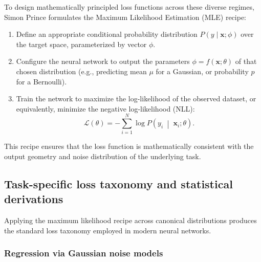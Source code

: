 \documentclass[../../../main.tex]{subfiles}
\begin{document}
To design mathematically principled loss functions across these diverse regimes, Simon Prince \citep{prince2023udl} formulates the Maximum Likelihood Estimation (MLE) recipe:
\begin{enumerate}[label=Step \arabic*:]
    \item Define an appropriate conditional probability distribution $P(y \mid \mathbf{x}; \phi)$ over the target space, parameterized by vector $\phi$.
    \item Configure the neural network to output the parameters $\phi = f(\mathbf{x}; \theta)$ of that chosen distribution (e.g., predicting mean $\mu$ for a Gaussian, or probability $p$ for a Bernoulli).
    \item Train the network to maximize the log-likelihood of the observed dataset, or equivalently, minimize the negative log-likelihood (NLL):
    \begin{equation}
    \mathcal{L}(\theta) = -\sum_{i=1}^N \log P\left(y_i \;\middle|\; \mathbf{x}_i; \theta\right).
    \end{equation}
\end{enumerate}
This recipe ensures that the loss function is mathematically consistent with the output geometry and noise distribution of the underlying task.

\subsection{Task-specific loss taxonomy and statistical derivations}
\label{subsec:loss_taxonomy_mle}

Applying the maximum likelihood recipe across canonical distributions produces the standard loss taxonomy employed in modern neural networks.

\subsubsection{Regression via Gaussian noise models}
\end{document}
